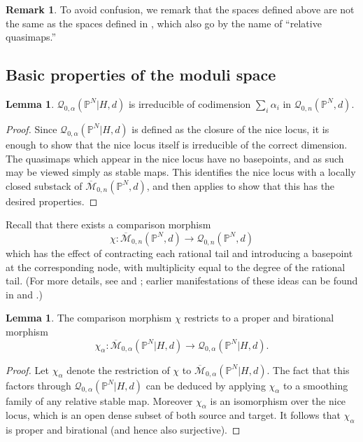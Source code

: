 \documentclass[10pt]{amsart}
\newcommand{\M}[4]{\overline{\mathcal{M}}_{#1,#2}(#3,#4)}
\newcommand{\Q}[4]{\mathcal{Q}_{#1,#2}(#3,#4)}
\newcommand{\PP}{\mathbb P}
\renewcommand{\to}{\rightarrow}
\theoremstyle{definition}
\theoremstyle{definition}
\newtheorem{lemma}[thm]{Lemma}
\newtheorem{remark}[thm]{Remark}
\begin{document}
\begin{remark} To avoid confusion, we remark that the spaces defined above are not the same as the spaces defined in \cite[\S 6]{OkounkovKTheory}, which also go by the name of ``relative quasimaps.''
\end{remark}

\subsection{Basic properties of the moduli space} \label{Subsection basic properties of the moduli space}
\begin{lemma}
 $\Q{0}{\alpha}{\PP^N|H}{d}$ is irreducible of codimension $\sum_i\alpha_i$ in $\Q{0}{n}{\PP^N}{d}$.
\end{lemma}
\begin{proof} Since $\Q{0}{\alpha}{\PP^N|H}{d}$ is defined as the closure of the nice locus, it is enough to show that the nice locus itself is irreducible of the correct dimension. The quasimaps which appear in the nice locus have no basepoints, and as such may be viewed simply as stable maps. This identifies the nice locus with a locally closed substack of $\M{0}{n}{\PP^N}{d}$, and then \cite[Lemma 1.8]{Ga} applies to show that this has the desired properties.\end{proof}

Recall that there exists a comparison morphism
\begin{equation*}\chi : \M{0}{n}{\PP^N}{d} \to \Q{0}{n}{\PP^N}{d} \end{equation*}
which has the effect of contracting each rational tail and introducing a basepoint at the corresponding node, with multiplicity equal to the degree of the rational tail. (For more details, see \cite[Theorem 3]{MOP} and \cite[\S 4.3]{Manolache-Push}; earlier manifestations of these ideas can be found in \cite{Bertram} and \cite{Popa-Roth}.)

\begin{lemma}\label{Comparison morphism birational}
 The comparison morphism $\chi$ restricts to a proper and birational morphism \[\chi_\alpha\colon \M{0}{\alpha}{\PP^N|H}{d}\to \Q{0}{\alpha}{\PP^N|H}{d}.\]
\end{lemma}
\begin{proof} Let $\chi_\alpha$ denote the restriction of $\chi$ to $\M{0}{\alpha}{\PP^N|H}{d}$. The fact that this factors through $\Q{0}{\alpha}{\PP^N|H}{d}$ can be deduced by applying $\chi_\alpha$ to a smoothing family of any relative stable map. Moreover $\chi_\alpha$ is an isomorphism over the nice locus, which is an open dense subset of both source and target. It follows that $\chi_\alpha$ is proper and birational (and hence also surjective).\end{proof}
\end{document}
